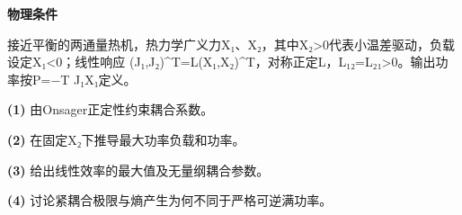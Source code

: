 \textbf{物理条件}\par 接近平衡的两通量热机，热力学广义力X₁、X₂，其中X₂>0代表小温差驱动，负载设定X₁<0；线性响应 (J₁,J₂)\textasciicircum{}T=L(X₁,X₂)\textasciicircum{}T，对称正定L，L₁₂=L₂₁>0。输出功率按P=−T J₁X₁定义。
\par\noindent\textbf{(1)} 由Onsager正定性约束耦合系数。
\par\noindent\textbf{(2)} 在固定X₂下推导最大功率负载和功率。
\par\noindent\textbf{(3)} 给出线性效率的最大值及无量纲耦合参数。
\par\noindent\textbf{(4)} 讨论紧耦合极限与熵产生为何不同于严格可逆满功率。
